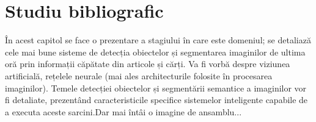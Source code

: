 \chapter{Studiu bibliografic}
\label{cap:studiu-bibliografic}
În acest capitol se face o prezentare a stagiului în care este domeniul; se detaliază cele mai bune sisteme de detecția obiectelor și segmentarea imaginilor de ultima oră prin informații căpătate din articole și cărți.\newline
Va fi vorbă despre viziunea artificială, rețelele neurale (mai ales architecturile folosite în procesarea imaginilor). Temele detecției obiectelor și segmentării semantice a imaginilor vor fi detaliate, prezentând caracteristicile specifice sistemelor inteligente capabile de a executa aceste sarcini.Dar mai întâi o imagine de ansamblu...\newline
